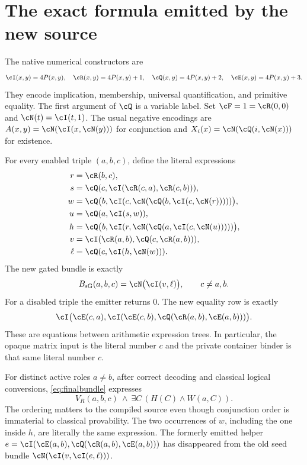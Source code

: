 \section{The exact formula emitted by the new source}
\label{sec:native}

The native numerical constructors are
\[
 \cI(x,y)=4P(x,y),\quad \cR(x,y)=4P(x,y)+1,\quad
 \cQ(x,y)=4P(x,y)+2,\quad \cE(x,y)=4P(x,y)+3.
\]
They encode implication, membership, universal quantification, and
primitive equality. The first argument of $\cQ$ is a variable label.
Set $\cF=1=\cR(0,0)$ and $\cN(t)=\cI(t,1)$. The usual negative
encodings are $A(x,y)=\cN(\cI(x,\cN(y)))$ for conjunction and
$X_i(x)=\cN(\cQ(i,\cN(x)))$ for existence.

For every enabled triple $(a,b,c)$, define the literal expressions
\begin{align}
 r&=\cR(b,c),\nonumber\\
 s&=\cQ(c,\cI(\cR(c,a),\cR(c,b))),\nonumber\\
 w&=\cQ\bigl(b,\cI(c,\cN(\cQ(b,\cI(c,\cN(r)))))\bigr),\label{eq:literal-w}\\
 u&=\cQ(a,\cI(s,w)),\nonumber\\
 h&=\cQ\bigl(b,\cI(r,\cN(\cQ(a,\cI(c,\cN(u)))))\bigr),\label{eq:literal-h}\\
 v&=\cI(\cR(a,b),\cQ(c,\cR(a,b))),\nonumber\\
 \ell&=\cQ(c,\cI(h,\cN(w))).\nonumber
\end{align}
The new gated bundle is exactly
\begin{equation}
 B_{\mathrm{sG}}(a,b,c)=\cN\bigl(\cI(v,\ell)\bigr),
 \qquad c\ne a,b.
 \label{eq:finalbundle}
\end{equation}
For a disabled triple the emitter returns $0$. The new equality row is
exactly
\begin{equation}
 \cI\bigl(\cE(c,a),\cI(\cE(c,b),
                \cQ(\cR(a,b),\cE(a,b)))\bigr).
 \label{eq:finalgcode}
\end{equation}
These are equations between arithmetic expression trees. In particular,
the opaque matrix input is the literal number $c$ and the private
container binder is that same literal number $c$.

For distinct active roles $a\ne b$, after correct decoding and classical logical conversions,
\eqref{eq:finalbundle} expresses
\[
 V_R(a,b,c)\ \land\ \exists C\,(H(C)\land W(a,C)).
\]
The ordering matters to the compiled source even though conjunction
order is immaterial to classical provability. The two occurrences of
$w$, including the one inside $h$, are literally the same expression.
The formerly emitted helper
$e=\cI(\cE(a,b),\cQ(\cR(a,b),\cE(a,b)))$
has disappeared from the old seed bundle $\cN(\cI(v,\cI(e,\ell)))$.

